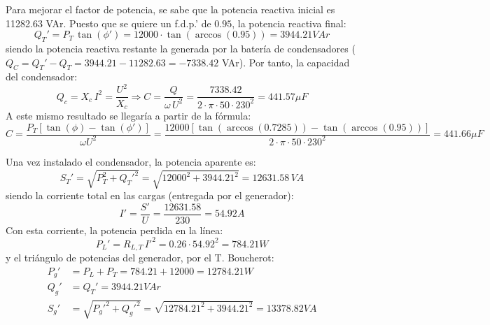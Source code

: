 Para mejorar el factor de potencia, se sabe que la potencia reactiva
inicial es 11282.63 VAr. Puesto que se quiere un f.d.p.' de $0.95$, la
potencia reactiva final:
\begin{equation*}
  Q_T'=P_T\,\tan(\phi')=12000\cdot \tan(\arccos(0.95))=3944.21 VAr
\end{equation*} siendo
la potencia reactiva restante la generada por la batería de
condensadores ($Q_C=Q_T'-Q_T=3944.21-11282.63=-7338.42$ VAr). Por
tanto, la capacidad del condensador:
\begin{equation*}
  Q_c=X_c\,I^2=\dfrac{U^2}{X_c}\Rightarrow
  C=\dfrac{Q}{\omega\,U^2}=\dfrac{7338.42}{2\cdot\pi\cdot 50\cdot
    230^2}=441.57 \mu F
\end{equation*} A este
mismo resultado se llegaría a partir de la fórmula:
\begin{equation*}
  C=\frac{P_T \left[\tan (\phi) - \tan (\phi')\right]}{\omega
    U^2}=\dfrac{12000\left[\tan (\arccos(0.7285)) - \tan
      (\arccos(0.95))\right]}{2\cdot\pi\cdot 50\cdot 230^2}=441.66 \mu F
\end{equation*}

Una vez instalado el condensador, la potencia aparente es:
\begin{equation*}
  S_T'=\sqrt{P_T^2+Q_T'^2}=\sqrt{12000^2+3944.21^2}=12631.58\,VA
\end{equation*} siendo
la corriente total en las cargas (entregada por el generador):
\begin{equation*}
  I'=\dfrac{S'}{U}=\dfrac{12631.58}{230}=54.92 A
\end{equation*} Con esta
corriente, la potencia perdida en la línea:
\begin{equation*}
  P_L'=R_{L,T}\,I'^2=0.26\cdot 54.92^2=784.21W
\end{equation*} y el
triángulo de potencias del generador, por el T. Boucherot:
\begin{align*}
  P_g'&=P_L+P_T=784.21+12000=12784.21 W\\ Q_g'&=Q_T'=3944.21 VAr\\
  S_g'&=\sqrt{P_g'^2+Q_g'^2}=\sqrt{12784.21^2+3944.21^2}=13378.82 VA
\end{align*}

